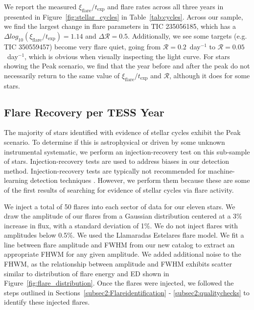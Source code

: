 \documentclass[twocolumn, linenumbers]{aastex631}
\begin{document}
We report the measured $\xi_\textrm{flare}/t_\textrm{exp}$ and flare rates across
all three years in presented in Figure~\ref{fig:stellar_cycles} in Table~\ref{tab:cycles}.
Across our sample, we find the largest change in flare parameters in TIC 235056185,
which has a $\Delta log_{10}(\xi_\textrm{flare} / t_\textrm{exp}) = 1.14$ and
$\Delta \mathcal{R} = 0.5$. Additionally, we see some targets (e.g. TIC 350559457)
become very flare quiet, going from $\mathcal{R} = 0.2$~day$^{-1}$ to $\mathcal{R} = 0.05$~day$^{-1}$,
which is obvious when visually inspecting the light curve. For stars showing the
Peak scenario, we find that the year before and after the peak do not necessarily
return to the same value of $\xi_\textrm{flare} / t_\textrm{exp}$ and $\mathcal{R}$,
although it does for some stars.


\subsection{Flare Recovery per TESS Year}\label{subsec:inj-rec}

The majority of stars identified with evidence of stellar cycles exhibit the Peak
scenario. To determine if this is astrophysical or driven by some unknown instrumental
systematic, we perform an injection-recovery test on this sub-sample of stars.
Injection-recovery tests are used to address biases in our detection method.
Injection-recovery tests are typically not recommended for machine-learning
detection techniques \citep{feinstein20}. However, we perform them because these
are some of the first results of searching for evidence of stellar cycles via
flare activity.

We inject a total of 50 flares into each sector of data for our eleven stars.
We draw the amplitude of our flares from a Gaussian distribution centered at a
3\% increase in flux, with a standard deviation of 1\%. We do not inject flares
with amplitudes below 0.5\%. We used the Llamaradas Estelares flare model. We
fit a line between flare amplitude and FWHM from our new catalog to extract an
appropriate FHWM for any given amplitude. We added additional noise to the FHWM,
as the relationship between amplitude and FWHM exhibits scatter similar to
distribution of flare energy and ED shown in Figure~\ref{fig:flare_distribution}.
Once the flares were injected, we followed the steps outlined in
Sections~\ref{subsec2:Flareidentification} - \ref{subsec2:qualitychecks}
to identify these injected flares.
\end{document}
